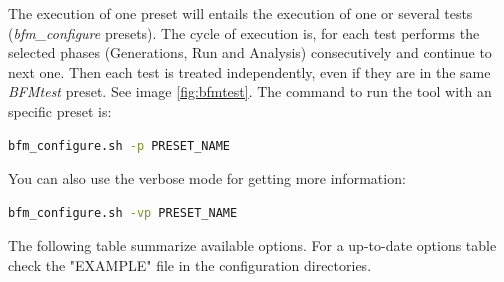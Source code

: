 The execution of one preset will entails the execution of one or several tests ({\it bfm\_configure} presets). The cycle of execution is, for each test performs the selected phases (Generations, Run and Analysis) consecutively and continue to next one. Then each test is treated independently, even if they are in the same {\it BFMtest} preset. See image \ref{fig:bfmtest}. The command to run the tool with an specific preset is:
\begin{lstlisting}[language=bash]
bfm_configure.sh -p PRESET_NAME
\end{lstlisting}
You can also use the verbose mode for getting more information:
\begin{lstlisting}[language=bash]
bfm_configure.sh -vp PRESET_NAME
\end{lstlisting}
\clearpage
The following table summarize available options. For a up-to-date options table check the "EXAMPLE" file in the configuration directories.
